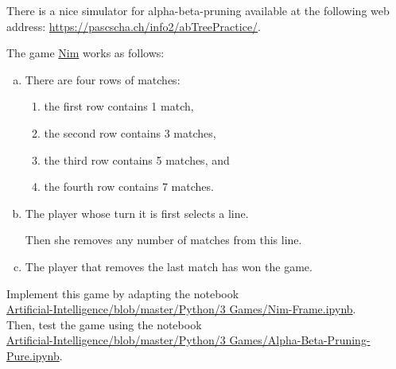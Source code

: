 \remark
There is a nice simulator for alpha-beta-pruning available at the following web address:
\href{https://pascscha.ch/info2/abTreePractice/}{https://pascscha.ch/info2/abTreePractice/}.

\exercise
The game \href{https://en.wikipedia.org/wiki/Nim}{Nim} works as follows:
\begin{enumerate}[(a)]
\item There are four rows of matches:
      \begin{enumerate}[1.]
      \item the first  row contains 1 match,
      \item the second row contains 3 matches,
      \item the third  row contains 5 matches, and
      \item the fourth row contains 7 matches.
     \end{enumerate}
\item The player whose turn it is first selects a line.
     
      Then she removes any number of matches from this line.
\item The player that removes the last match has won the game. 
\end{enumerate}
Implement this game by adapting the notebook
\\[0.2cm]
\hspace*{1.3cm}
\href{https://github.com/karlstroetmann/Artificial-Intelligence/blob/master/Python/3 Games/Nim-Frame.ipynb}{
   Artificial-Intelligence/blob/master/Python/3 Games/Nim-Frame.ipynb}.
\\[0.2cm]
 Then,  test the game using the notebook
\\[0.2cm]
\hspace*{1.3cm}
\href{https://github.com/karlstroetmann/Artificial-Intelligence/blob/master/Python/3 Games/Alpha-Beta-Pruning-Pure.ipynb}{Artificial-Intelligence/blob/master/Python/3 Games/Alpha-Beta-Pruning-Pure.ipynb}.
\eox


